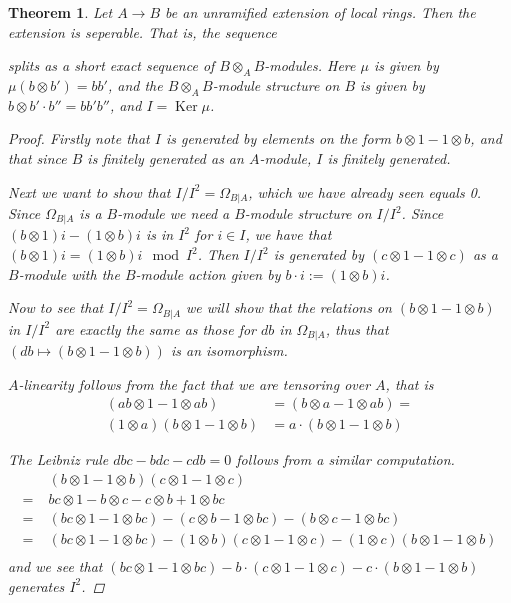 \documentclass[11pt, a4paper, english]{article}
\newtheorem{theorem}{Theorem}[section]
\theoremstyle{definition}
\DeclareMathOperator{\Ker}{Ker}
\begin{document}
\begin{theorem}
\label{thm:unramified_implies_seperable}
Let $A \to B$ be an unramified extension of local rings. Then the extension is seperable. That is, the sequence
\begin{center}
\end{center}
splits as a short exact sequence of $B\otimes_AB$-modules. Here $\mu$ is given by $\mu(b \otimes b') = bb'$, and the $B \otimes_A B$-module structure on $B$ is given by $b \otimes b' \cdot b'' = bb'b''$, and $I = \Ker \mu$.

\begin{proof}
Firstly note that $I$ is generated by elements on the form $b \otimes 1 - 1 \otimes b$, and that since $B$ is finitely generated as an $A$-module, $I$ is finitely generated.

Next we want to show that $I/I^2 = \Omega_{B|A}$, which we have already seen equals 0. Since $\Omega_{B|A}$ is a $B$-module we need a $B$-module structure on $I/I^2$. Since $(b \otimes 1)i - (1\otimes b)i$ is in $I^2$ for $i \in I$, we have that $(b \otimes 1)i = (1 \otimes b)i \mod I^2$. Then $I/I^2$ is generated by $(c \otimes 1 - 1 \otimes c)$ as a $B$-module with the $B$-module action given by $b \cdot i := (1 \otimes b)i$.

Now to see that $I/I^2 = \Omega_{B|A}$ we will show that the relations on $(b \otimes 1 - 1 \otimes b)$ in $I/I^2$ are exactly the same as those for $db$ in $\Omega_{B|A}$, thus that $(db \mapsto (b \otimes 1 - 1 \otimes b))$ is an isomorphism.

$A$-linearity follows from the fact that we are tensoring over $A$, that is
\begin{align*}
(ab \otimes 1 - 1 \otimes ab) &= (b \otimes a - 1 \otimes ab) =\\
(1 \otimes a)(b \otimes 1 - 1 \otimes b) &= a \cdot
(b \otimes 1 - 1 \otimes b)
\end{align*}

The Leibniz rule $dbc - bdc - cdb = 0$ follows from a similar computation.
\begin{align*}
& \;(b \otimes 1 - 1 \otimes b)(c \otimes 1 - 1 \otimes c) \\
=&\; bc \otimes 1 - b \otimes c - c \otimes b + 1 \otimes bc \\
=&\; (bc \otimes 1 - 1 \otimes bc) - (c \otimes b - 1 \otimes bc) - (b \otimes c - 1 \otimes bc)\\
=&\; (bc \otimes 1 - 1 \otimes bc) - (1 \otimes b)(c \otimes 1 - 1 \otimes c) - (1 \otimes c)(b \otimes 1 - 1 \otimes b)\\
\end{align*}
and we see that $(bc \otimes 1 - 1 \otimes bc) - b \cdot (c \otimes 1 - 1 \otimes c) - c \cdot (b \otimes 1 - 1 \otimes b)$ generates $I^2$.


\end{proof}
\end{theorem}
\end{document}

